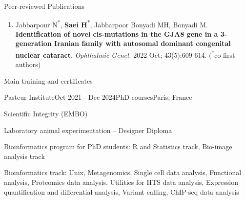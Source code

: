 \documentclass[
	11pt, %
]{resume} %
\begin{document}
\begin{rSection}{Peer-reviewed Publications}
\begin{enumerate}
  \item Jabbarpour N\textsuperscript{*}, \textbf{Saei H}\textsuperscript{*}, Jabbarpoor Bonyadi MH, Bonyadi M. 
   \textbf{Identification of novel cis-mutations in the GJA8 gene in a 3-generation Iranian family with autosomal dominant congenital nuclear cataract}. 
  \textit{Ophthalmic Genet}. 2022 Oct; 43(5):609-614. (\textsuperscript{*}co-first authors)
\end{enumerate}

\end{rSection}


\begin{rSection}{Main training and certificates}

	\begin{rSubsection}{Pasteur Institute}{Oct 2021 - Dec 2024}{PhD courses}{Paris, France}
		\item Scientific Integrity (EMBO)
		\item Laboratory animal experimentation – Designer Diploma
		\item Bioinformatics program for PhD students: R and Statistics track, Bio-image
analysis track
		\item Bioinformatics track: Unix, Metagenomics, Single cell data analysis, Functional analysis, Proteomics data
analysis, Utilities for HTS data analysis, Expression quantification and differential analysis, Variant
calling, ChIP-seq data analysis
	\end{rSubsection}
	
\end{rSection}

\end{document}
